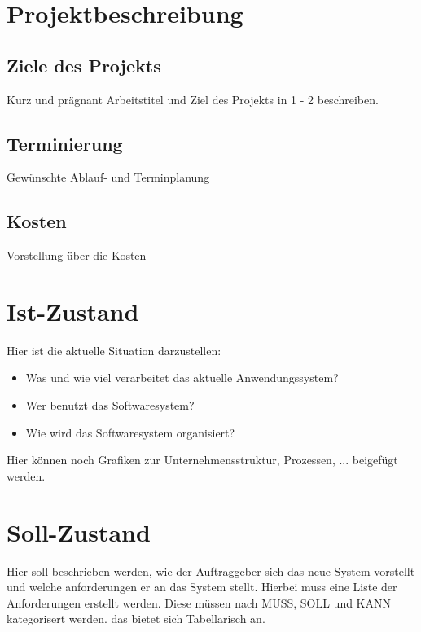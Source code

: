 \documentclass[10pt,a4paper]{article}
\begin{document}
\maketitle
\newpage
{}
\tableofcontents
\newpage
\listoffigures
\newpage
\listoftables
\newpage
{}

    \section{Projektbeschreibung}
    \subsection{Ziele des Projekts}
    Kurz und prägnant Arbeitstitel und Ziel des Projekts in 1 - 2 beschreiben.
    \subsection{Terminierung}
    Gewünschte Ablauf- und Terminplanung
    \subsection{Kosten}
    Vorstellung über die Kosten

    \section{Ist-Zustand}
    Hier ist die aktuelle Situation darzustellen:
    \begin{itemize}
        \item Was und wie viel verarbeitet das aktuelle Anwendungssystem?
        \item Wer benutzt das Softwaresystem?
        \item Wie wird das Softwaresystem organisiert?
    \end{itemize}
    Hier können noch Grafiken zur Unternehmensstruktur, Prozessen, ... beigefügt werden.

    \section{Soll-Zustand}
    Hier soll beschrieben werden, wie der Auftraggeber sich das neue System vorstellt und 
    welche anforderungen er an das System stellt.
    Hierbei muss eine Liste der Anforderungen erstellt werden.
    Diese müssen nach MUSS, SOLL und KANN kategorisert werden.
    das bietet sich Tabellarisch an.
\end{document}
